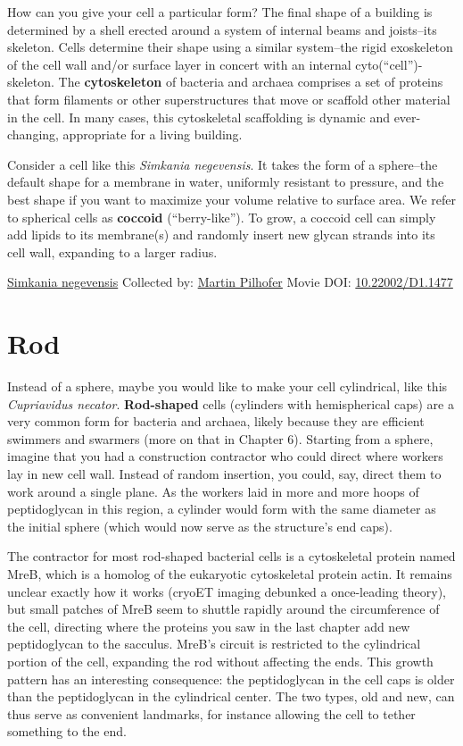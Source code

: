 \documentclass[]{tufte-book}
\begin{document}
How can you give your cell a particular form? The final shape of a building is determined by a shell erected around a system of internal beams and joists--its skeleton. Cells determine their shape using a similar system--the rigid exoskeleton of the cell wall and/or surface layer in concert with an internal cyto(``cell'')-skeleton. The \textbf{cytoskeleton} of bacteria and archaea comprises a set of proteins that form filaments or other superstructures that move or scaffold other material in the cell. In many cases, this cytoskeletal scaffolding is dynamic and ever-changing, appropriate for a living building.

Consider a cell like this \emph{Simkania negevensis}. It takes the form of a sphere--the default shape for a membrane in water, uniformly resistant to pressure, and the best shape if you want to maximize your volume relative to surface area. We refer to spherical cells as \textbf{coccoid} (``berry-like''). To grow, a coccoid cell can simply add lipids to its membrane(s) and randomly insert new glycan strands into its cell wall, expanding to a larger radius.



\hypertarget{htmlwidget-07762190f9998962ccc2}{}

\label{fig:3-1}\protect\hyperlink{tree}{Simkania negevensis} Collected by: \protect\hyperlink{martin_pilhofer}{Martin Pilhofer} Movie DOI: \href{https://doi.org/10.22002/D1.1477}{10.22002/D1.1477}

\hypertarget{rod}{%
\section{Rod}\label{rod}}

Instead of a sphere, maybe you would like to make your cell cylindrical, like this \emph{Cupriavidus necator}. \textbf{Rod-shaped} cells (cylinders with hemispherical caps) are a very common form for bacteria and archaea, likely because they are efficient swimmers and swarmers (more on that in Chapter 6). Starting from a sphere, imagine that you had a construction contractor who could direct where workers lay in new cell wall. Instead of random insertion, you could, say, direct them to work around a single plane. As the workers laid in more and more hoops of peptidoglycan in this region, a cylinder would form with the same diameter as the initial sphere (which would now serve as the structure's end caps).

The contractor for most rod-shaped bacterial cells is a cytoskeletal protein named MreB, which is a homolog of the eukaryotic cytoskeletal protein actin. It remains unclear exactly how it works (cryoET imaging debunked a once-leading theory), but small patches of MreB seem to shuttle rapidly around the circumference of the cell, directing where the proteins you saw in the last chapter add new peptidoglycan to the sacculus. MreB's circuit is restricted to the cylindrical portion of the cell, expanding the rod without affecting the ends. This growth pattern has an interesting consequence: the peptidoglycan in the cell caps is older than the peptidoglycan in the cylindrical center. The two types, old and new, can thus serve as convenient landmarks, for instance allowing the cell to tether something to the end.
\end{document}
